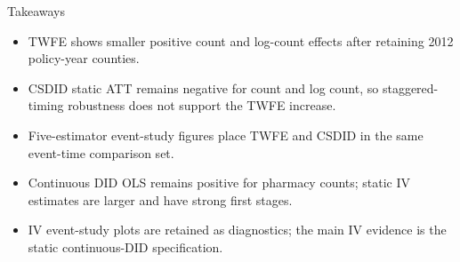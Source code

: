 \documentclass{beamer}
\begin{document}
\begin{frame}{Takeaways}
\small
\begin{itemize}\setlength\itemsep{0.65em}
    \item TWFE shows smaller positive count and log-count effects after retaining 2012 policy-year counties.
    \item CSDID static ATT remains negative for count and log count, so staggered-timing robustness does not support the TWFE increase.
    \item Five-estimator event-study figures place TWFE and CSDID in the same event-time comparison set.
    \item Continuous DID OLS remains positive for pharmacy counts; static IV estimates are larger and have strong first stages.
    \item IV event-study plots are retained as diagnostics; the main IV evidence is the static continuous-DID specification.
\end{itemize}
\end{frame}
\end{document}
